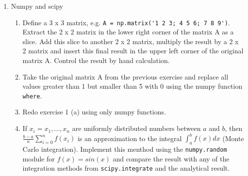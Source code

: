 \documentclass{article}
\begin{document}
\begin{enumerate}
    \item Numpy and scipy
    \begin{enumerate}
      \item Define a 3 x 3 matrix, e.g. 
      \verb#A = np.matrix('1 2 3; 4 5 6; 7 8 9')#. Extract the 2 x 2 matrix in
      the lower right corner of the matrix A as a slice. Add this slice to another 2 x 2 matrix, multiply the result by a 2 x 2 matrix and insert this final result in the upper left corner of the original matrix A.
      Control the result by hand calculation. 
      \item Take the original matrix A from the previous exercise and
       replace all values greater than 1 but smaller than 5 with 0 using the
       numpy function \verb#where#.
      \item Redo exercise 1 (a) using only numpy functions.
      \item If $x_i = x_1, \ldots, x_n$ are uniformly distributed numbers
      between $a$ and $b$, then $\frac{b-a}{n}\sum_{i=0}^n f(x_i)$ is an
      approximation to the integral $\int_a^b f(x)dx$ (Monte Carlo integration).
      Implement this menthod using the \verb#numpy.random# module for $f(x) =
      sin(x)$ and compare the result with any of the integration methods from
      \verb#scipy.integrate# and the analytical result.
    \end{enumerate}
    

\end{enumerate}
\end{document}
